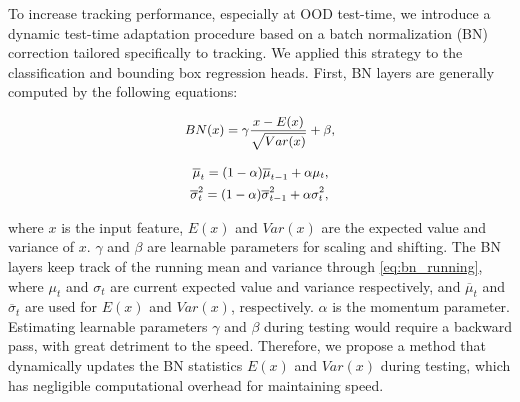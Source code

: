 To increase tracking performance, especially at OOD test-time, we introduce a dynamic test-time adaptation procedure based on a batch normalization (BN) correction tailored specifically to tracking. We applied this strategy to the classification and bounding box regression heads. First, BN layers are generally computed by the following equations:


\begin{equation}\small
    \centering
    \label{eq:bn}
        \begin{aligned}  
        BN(x) = \gamma \frac{x - E(x)}{\sqrt{Var(x)}} +  \beta ,
        \end{aligned}
\end{equation}
  
\begin{equation}\small
    \centering
    \label{eq:bn_running}
        \begin{aligned}  
            \overline{\mu}_t = (1-\alpha)  \overline{\mu}_{t-1} +  \alpha  {\mu}_t ,\\
            \overline{\sigma}_{t}^2 = (1-\alpha) \overline{\sigma}_{t-1}^2 +  \alpha {\sigma}_{t}^2 ,
        \end{aligned}
\end{equation}
    
where $x$ is the input feature, $E(x)$ and $Var(x)$ are the expected value and variance of $x$. $\gamma$ and $\beta$ are learnable parameters for scaling and shifting. The BN layers keep track of the running mean and variance through \ref{eq:bn_running}, where ${\mu}_t$ and ${\sigma}_{t}$ are current expected value and variance respectively, and $\overline{\mu}_t$ and $\overline{\sigma}_{t}$ are used for $E(x)$ and $Var(x)$, respectively. $\alpha$ is the momentum parameter. 
Estimating learnable parameters $\gamma$ and $\beta$ during testing would require a backward pass, with great detriment to the speed. Therefore, we propose a method that dynamically updates the BN statistics $E(x)$ and $Var(x)$ during testing, which has negligible computational overhead for maintaining speed.\\

